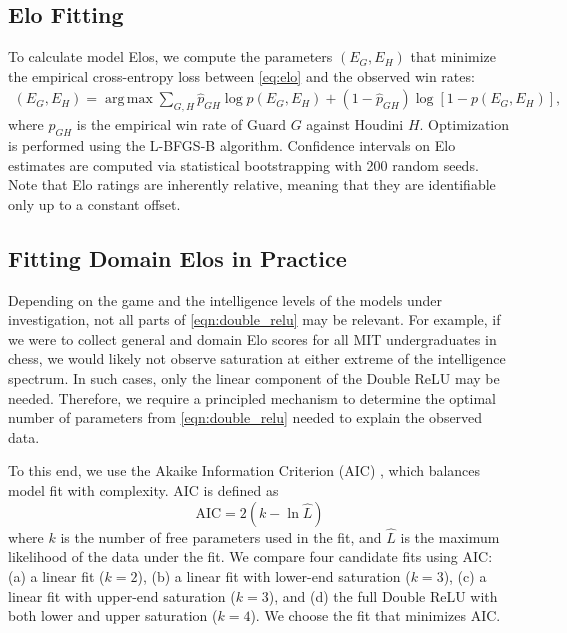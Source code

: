 \documentclass{article}
\DeclareMathOperator*{\argmax}{arg\,max}
\begin{document}
\subsection{Elo Fitting}
\label{sec:app_elo}
To calculate model Elos, we compute the parameters $(E_G,E_H)$ that minimize the empirical cross-entropy loss between \cref{eq:elo} and the observed win rates:
\begin{align}
(E_G,E_H) = \argmax
\sum_{G,H} 
    \hat{p}_{GH} \log p(E_G, E_H) 
   + (1 - \hat{p}_{GH}) \log \left[1 - p(E_G, E_H)\right],
\end{align}
where $\hat{p}_{GH}$ is the empirical win rate of Guard $G$ against Houdini $H$. Optimization is performed using the L-BFGS-B algorithm. Confidence intervals on Elo estimates are computed via statistical bootstrapping with 200 random seeds. Note that Elo ratings are inherently relative, meaning that they are identifiable only up to a constant offset.

\subsection{Fitting Domain Elos in Practice}
\label{sec:app_aic}
Depending on the game and the intelligence levels of the models under investigation, not all parts of \cref{eqn:double_relu} may be relevant. For example, if we were to collect general and domain Elo scores for all MIT undergraduates in chess, we would likely not observe saturation at either extreme of the intelligence spectrum. In such cases, only the linear component of the Double ReLU may be needed. Therefore, we require a principled mechanism to determine the optimal number of parameters from \cref{eqn:double_relu} needed to explain the observed data. 

To this end, we use the Akaike Information Criterion (AIC) \citep{cavanaugh2019akaike}, which balances model fit with complexity. AIC is defined as
\begin{equation}
    \mathrm{AIC} = 2(k -  \ln\hat{L})
\end{equation}
where $k$ is the number of free parameters used in the fit, and $\hat{L}$ is the maximum likelihood of the data under the fit. We compare four candidate fits using AIC: (a) a linear fit ($k = 2$), (b) a linear fit with lower-end saturation ($k = 3$), (c) a linear fit with upper-end saturation ($k = 3$), and (d) the full Double ReLU with both lower and upper saturation ($k = 4$). We choose the fit that minimizes AIC. 
\end{document}
